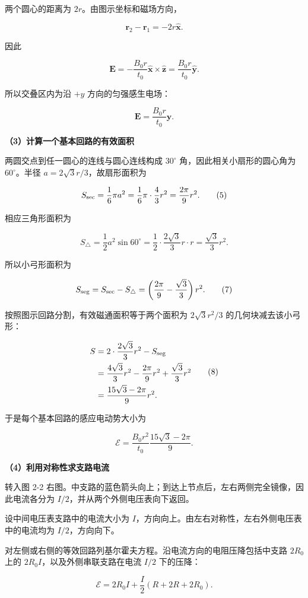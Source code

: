 \documentclass[12pt,a4paper,UTF8]{ctexart}
\begin{document}
两个圆心的距离为 \(2r\)。由图示坐标和磁场方向，

\[
\bm r_2-\bm r_1=-2r\hat{\bm x}.
\]

因此

\[
\bm E
=-\frac{B_0r}{t_0}\hat{\bm x}\times\hat{\bm z}
=\frac{B_0r}{t_0}\hat{\bm y}.
\]

所以交叠区内为沿 \(+y\) 方向的匀强感生电场：

\[
\boxed{\bm E=\frac{B_0r}{t_0}\hat{\bm y}}.
\tag{4}
\]

\textbf{（3）计算一个基本回路的有效面积}

两圆交点到任一圆心的连线与圆心连线构成 \(30^\circ\)
角，因此相关小扇形的圆心角为 \(60^\circ\)。半径
\(a=2\sqrt3r/3\)，故扇形面积为

\[
S_{\rm sec}=\frac16\pi a^2
=\frac16\pi\cdot\frac43r^2
=\frac{2\pi}{9}r^2.
\tag{5}
\]

相应三角形面积为

\[
S_{\triangle}=\frac12a^2\sin60^\circ
=\frac12\cdot\frac{2\sqrt3}{3}r\cdot r
=\frac{\sqrt3}{3}r^2.
\tag{6}
\]

所以小弓形面积为

\[
S_{\rm seg}=S_{\rm sec}-S_{\triangle}
=\left(\frac{2\pi}{9}-\frac{\sqrt3}{3}\right)r^2.
\tag{7}
\]

按照图示回路分割，有效磁通面积等于两个面积为 \(2\sqrt3r^2/3\)
的几何块减去该小弓形：

\[
\begin{aligned}
S
&=2\cdot\frac{2\sqrt3}{3}r^2-S_{\rm seg}\\
&=\frac{4\sqrt3}{3}r^2-\frac{2\pi}{9}r^2+\frac{\sqrt3}{3}r^2\\
&=\frac{15\sqrt3-2\pi}{9}r^2.
\end{aligned}
\tag{8}
\]

于是每个基本回路的感应电动势大小为

\[
\boxed{\mathcal E=\frac{B_0r^2}{t_0}\frac{15\sqrt3-2\pi}{9}}.
\tag{9}
\]

\textbf{（4）利用对称性求支路电流}

转入图 2-2
右图。中支路的蓝色箭头向上；到达上节点后，左右两侧完全镜像，因此电流各分为
\(I/2\)，并从两个外侧电压表向下返回。

设中间电压表支路中的电流大小为
\(I\)，方向向上。由左右对称性，左右外侧电压表中的电流均为
\(I/2\)，方向向下。

对左侧或右侧的等效回路列基尔霍夫方程。沿电流方向的电阻压降包括中支路
\(2R_0\) 上的 \(2R_0I\)，以及外侧串联支路在电流 \(I/2\) 下的压降：

\[
\mathcal E
=2R_0I+\frac I2(R+2R+2R_0).
\tag{10}
\]
\end{document}
